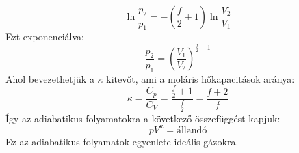 \documentclass[../main.tex]{subfiles}
\begin{document}
\begin{equation}
    \ln{\frac{p_2}{p_1}} = - \left(\frac{f}{2} + 1\right) \ln{\frac{V_2}{V_1}}
\end{equation}
Ezt exponenciálva:
\begin{equation}
    \frac{p_2}{p_1} = \left(\frac{V_1}{V_2}\right)^{\frac{f}{2} + 1}
\end{equation}
Ahol bevezethetjük a $\kappa$ kitevőt, ami a moláris hőkapacitások aránya:
\begin{equation}
    \kappa = \frac{C_p}{C_V} = \frac{\frac{f}{2} + 1}{\frac{f}{2}} = \frac{f + 2}{f}
\end{equation}
Így az adiabatikus folyamatokra a következő összefüggést kapjuk:
\begin{equation}
    p V^{\kappa} = \text{állandó}
\end{equation}
Ez az adiabatikus folyamatok egyenlete ideális gázokra.
\end{document}

